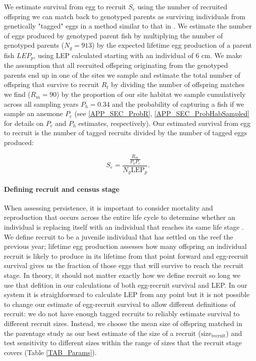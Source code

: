 \documentclass[12pt, oneside]{article}   	%
\begin{document}
We estimate survival from egg to recruit $S_e$ using the number of recruited offspring we can match back to genotyped parents as surviving individuals from genetically "tagged" eggs in a method similar to that in \cite{johnson2018integrating}. We estimate the number of eggs produced by genotyped parent fish by multiplying the number of genotyped parents ($N_g = 913$) by the expected lifetime egg production of a parent fish $LEP_p$, using LEP calculated starting with an individual of 6 cm. We make the assumption that all recruited offspring originating from the genotyped parents end up in one of the sites we sample and estimate the total number of offspring that survive to recruit $R_t$ by dividing the number of offspring matches we find ($R_m = 90$) by the proportion of our site habitat we sample cumulatively across all sampling years $P_h = 0.34$ and the probability of capturing a fish if we sample an anemone $P_c$ (see \ref{APP_SEC_ProbR}, \ref{APP_SEC_ProbHabSampled} for details on $P_c$ and $P_h$ estimates, respectively). Our estimated survival from egg to recruit is the number of tagged recruits divided by the number of tagged eggs produced:

\begin{equation}
S_e = \frac{\frac{R_m}{P_h P_c}}{N_g \text{LEP}_p}. \label{EQN_EggRecruitSurv}
\end{equation}

\paragraph*{Defining recruit and census stage} %

When assessing persistence, it is important to consider mortality and reproduction that occurs across the entire life cycle to determine whether an individual is replacing itself with an individual that reaches its same life stage \citep{burgess2014beyond}. We define recruit to be a juvenile individual that has settled on the reef the previous year; lifetime egg production assesses how many offspring an individual recruit is likely to produce in its lifetime from that point forward and egg-recruit survival gives us the fraction of those eggs that will survive to reach the recruit stage. In theory, it should not matter exactly how we define recruit so long we use that defition in our calculations of both egg-recruit survival and LEP. In our system it is straighforward to calculate LEP from any point but it is not possible to change our estimate of egg-recruit survival to allow different definitions of recruit: we do not have enough tagged recruits to reliably estimate survival to different recruit sizes. Instead, we choose the mean size of offspring matched in the parentage study as our best estimate of the size of a recruit ($\text{size}_\text{recruit}$) and test sensitivity to different sizes within the range of sizes that the recruit stage covers (Table \ref{TAB_Params}).
\end{document}
